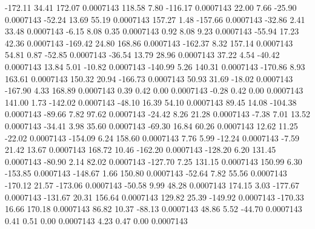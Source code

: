      -172.11       34.41      172.07     0.0007143
      118.58        7.80     -116.17     0.0007143
       22.00        7.66      -25.90     0.0007143
      -52.24       13.69       55.19     0.0007143
      157.27        1.48     -157.66     0.0007143
      -32.86        2.41       33.48     0.0007143
       -6.15        8.08        0.35     0.0007143
        0.92        8.08        9.23     0.0007143
      -55.94       17.23       42.36     0.0007143
     -169.42       24.80      168.86     0.0007143
     -162.37        8.32      157.14     0.0007143
       54.81        0.87      -52.85     0.0007143
      -36.54       13.79       28.96     0.0007143
       37.22        4.54      -40.42     0.0007143
       13.84        5.01      -10.82     0.0007143
     -140.99        5.26      140.31     0.0007143
     -170.86        8.93      163.61     0.0007143
      150.32       20.94     -166.73     0.0007143
       50.93       31.69      -18.02     0.0007143
     -167.90        4.33      168.89     0.0007143
        0.39        0.42        0.00     0.0007143
       -0.28        0.42        0.00     0.0007143
      141.00        1.73     -142.02     0.0007143
      -48.10       16.39       54.10     0.0007143
       89.45       14.08     -104.38     0.0007143
      -89.66        7.82       97.62     0.0007143
      -24.42        8.26       21.28     0.0007143
       -7.38        7.01       13.52     0.0007143
      -34.41        3.98       35.60     0.0007143
      -69.30       16.84       60.26     0.0007143
       12.62       11.25      -22.02     0.0007143
     -154.09        6.24      158.60     0.0007143
        7.76        5.99      -12.24     0.0007143
       -7.59       21.42       13.67     0.0007143
      168.72       10.46     -162.20     0.0007143
     -128.20        6.20      131.45     0.0007143
      -80.90        2.14       82.02     0.0007143
     -127.70        7.25      131.15     0.0007143
      150.99        6.30     -153.85     0.0007143
     -148.67        1.66      150.80     0.0007143
      -52.64        7.82       55.56     0.0007143
     -170.12       21.57     -173.06     0.0007143
      -50.58        9.99       48.28     0.0007143
      174.15        3.03     -177.67     0.0007143
     -131.67       20.31      156.64     0.0007143
      129.82       25.39     -149.92     0.0007143
     -170.33       16.66      170.18     0.0007143
       86.82       10.37      -88.13     0.0007143
       48.86        5.52      -44.70     0.0007143
        0.41        0.51        0.00     0.0007143
        4.23        0.47        0.00     0.0007143
